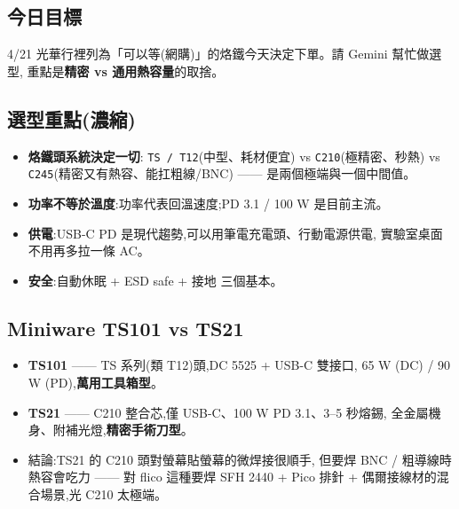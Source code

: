 
\subsection*{今日目標}

4/21 光華行裡列為「可以等(網購)」的烙鐵今天決定下單。請 Gemini 幫忙做選型,
重點是\textbf{精密 vs 通用熱容量}的取捨。

\subsection*{選型重點(濃縮)}

\begin{itemize}[leftmargin=2em,itemsep=0pt]
  \item \textbf{烙鐵頭系統決定一切}:
        \texttt{TS / T12}(中型、耗材便宜) vs \texttt{C210}(極精密、秒熱)
        vs \texttt{C245}(精密又有熱容、能扛粗線/BNC) —— 是兩個極端與一個中間值。
  \item \textbf{功率不等於溫度}:功率代表回溫速度;PD 3.1 / 100 W 是目前主流。
  \item \textbf{供電}:USB-C PD 是現代趨勢,可以用筆電充電頭、行動電源供電,
        實驗室桌面不用再多拉一條 AC。
  \item \textbf{安全}:自動休眠 + ESD safe + 接地 三個基本。
\end{itemize}

\subsection*{Miniware TS101 vs TS21}

\begin{itemize}[leftmargin=2em,itemsep=0pt]
  \item \textbf{TS101} —— TS 系列(類 T12)頭,DC 5525 + USB-C 雙接口,
        65 W (DC) / 90 W (PD),\textbf{萬用工具箱型}。
  \item \textbf{TS21} —— C210 整合芯,僅 USB-C、100 W PD 3.1、3--5 秒熔錫,
        全金屬機身、附補光燈,\textbf{精密手術刀型}。
  \item 結論:TS21 的 C210 頭對螢幕貼螢幕的微焊接很順手,
        但要焊 BNC / 粗導線時熱容會吃力 —— 對 flico 這種要焊 SFH 2440 + Pico 排針
        + 偶爾接線材的混合場景,光 C210 太極端。
\end{itemize}

